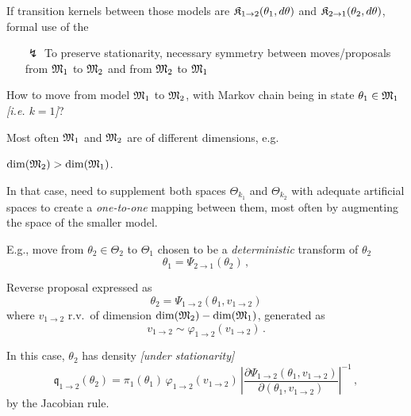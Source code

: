 \begin{slide}
\end{slide}\begin{slide}

If transition kernels between those models are $\mathfrak{K}_{1\rightarrow2}(\theta_1,d\theta)$ and
$\mathfrak{K}_{2\rightarrow1}(\theta_2,d\theta)$, formal use of the 

\vs\pause
\begin{itemize}
\item[$\lightning$] To preserve stationarity, necessary symmetry between 
moves/proposals from $\mathfrak{M}_1$ to $\mathfrak{M}_2$ and from $\mathfrak{M}_2$ to  $\mathfrak{M}_1$
\end{itemize}


\end{slide}\begin{slide}

How to move from model $\mathfrak{M}_1$ to $\mathfrak{M}_2$,
with Markov chain being in state $\theta_1\in\mathfrak{M}_1$ {\em [i.e. $k=1$]}?

\vs\pause
Most often $\mathfrak{M}_1$ and $\mathfrak{M}_2$ are of different dimensions, e.g.
\centerline{$\dim(\mathfrak{M}_2)>\dim(\mathfrak{M}_1)$.}

\vs In that case, need to supplement both spaces $\Theta_{k_1}$ and
$\Theta_{k_2}$ with adequate artificial spaces to create a
{\em one-to-one} mapping between them, most often by augmenting the space of
the smaller model. 

\end{slide}\begin{slide}

E.g., move from  $\theta_2\in{\Theta}_2$ to ${\Theta}_1$ chosen to be
a {\em deterministic} transform of $\theta_2$
$$
\theta_1=\Psi_{2\rightarrow 1}(\theta_{2})\,,
$$

\pause
Reverse proposal expressed as
$$
\theta_2 = \Psi_{1\rightarrow 2}(\theta_1,v_{1\rightarrow 2})
$$
where $v_{1\rightarrow 2}$ r.v.~of dimension
$\dim(\mathfrak{M}_2)-\dim(\mathfrak{M}_1)$, generated as
$$
v_{1\rightarrow 2} \sim \varphi_{1\rightarrow 2}(v_{1\rightarrow 2})\,.
$$

\end{slide}\begin{slide}

In this case, $\theta_2$ has density {\em [under stationarity]}
$$
\mathfrak{q}_{1\rightarrow 2}(\theta_2) =
\pi_1(\theta_1)\,\varphi_{1\rightarrow 2}(v_{1\rightarrow 2})\,
\left| \frac{\partial \Psi_{1\rightarrow 2}(\theta_1,v_{1\rightarrow 2})}{
             \partial (\theta_1,v_{1\rightarrow 2}) } \right|^{-1}\,,
$$
by the Jacobian rule. 


\end{slide}
